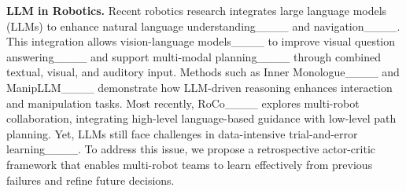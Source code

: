 
\noindent \textbf{LLM in Robotics.}
Recent robotics research integrates large language models (LLMs) to enhance natural language understanding____ and navigation____. This integration allows vision-language models____ to improve visual question answering____ and support multi-modal planning____ through combined textual, visual, and auditory input. Methods such as Inner Monologue____ and ManipLLM____ demonstrate how LLM-driven reasoning enhances interaction and manipulation tasks. Most recently, RoCo____ explores multi-robot collaboration, integrating high-level language-based guidance with low-level path planning. Yet, LLMs still face challenges in data-intensive trial-and-error learning____. To address this issue, we propose a retrospective actor-critic framework that enables multi-robot teams to learn effectively from previous failures and refine future decisions.